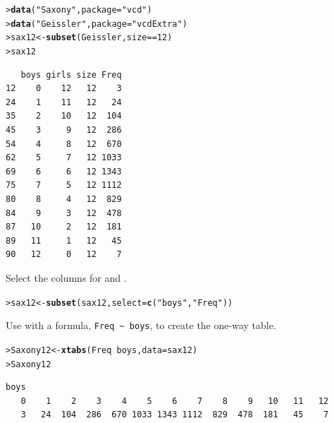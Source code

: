 \documentclass[11pt]{report}\usepackage[]{graphicx}\usepackage[]{color}
\makeatletter
\newcommand{\hlnum}[1]{\textcolor[rgb]{0.686,0.059,0.569}{#1}}%
\newcommand{\hlstr}[1]{\textcolor[rgb]{0.192,0.494,0.8}{#1}}%
\newcommand{\hlopt}[1]{\textcolor[rgb]{0,0,0}{#1}}%
\newcommand{\hlstd}[1]{\textcolor[rgb]{0.345,0.345,0.345}{#1}}%
\newcommand{\hlkwb}[1]{\textcolor[rgb]{0.69,0.353,0.396}{#1}}%
\newcommand{\hlkwc}[1]{\textcolor[rgb]{0.333,0.667,0.333}{#1}}%
\newcommand{\hlkwd}[1]{\textcolor[rgb]{0.737,0.353,0.396}{\textbf{#1}}}%
\newenvironment{kframe}{%
 \def\at@end@of@kframe{}%
 \ifinner\ifhmode%
  \def\at@end@of@kframe{\end{minipage}}%
  \begin{minipage}{\columnwidth}%
 \fi\fi%
 \def\FrameCommand##1{\hskip\@totalleftmargin \hskip-\fboxsep
 \colorbox{shadecolor}{##1}\hskip-\fboxsep
     \hskip-\linewidth \hskip-\@totalleftmargin \hskip\columnwidth}%
 \MakeFramed {\advance\hsize-\width
   \@totalleftmargin\z@ \linewidth\hsize
   \@setminipage}}%
 {\par\unskip\endMakeFramed%
 \at@end@of@kframe}
\newenvironment{knitrout}{}{} %
\renewenvironment{knitrout}{\small\renewcommand{\baselinestretch}{.85}}{} %
\makeatother
\begin{document}
\begin{Exercises}
\begin{enumerate*}
\begin{ans}
\begin{knitrout}
\begin{kframe}
\begin{alltt}
\hlstd{> }\hlkwd{data}\hlstd{(}\hlstr{"Saxony"}\hlstd{,} \hlkwc{package}\hlstd{=}\hlstr{"vcd"}\hlstd{)}
\hlstd{> }\hlkwd{data}\hlstd{(}\hlstr{"Geissler"}\hlstd{,} \hlkwc{package}\hlstd{=}\hlstr{"vcdExtra"}\hlstd{)}
\hlstd{> }\hlstd{sax12} \hlkwb{<-} \hlkwd{subset}\hlstd{(Geissler, size}\hlopt{==}\hlnum{12}\hlstd{)}
\hlstd{> }\hlstd{sax12}
\end{alltt}
\begin{verbatim}
   boys girls size Freq
12    0    12   12    3
24    1    11   12   24
35    2    10   12  104
45    3     9   12  286
54    4     8   12  670
62    5     7   12 1033
69    6     6   12 1343
75    7     5   12 1112
80    8     4   12  829
84    9     3   12  478
87   10     2   12  181
89   11     1   12   45
90   12     0   12    7
\end{verbatim}
\end{kframe}
\end{knitrout}
    \end{ans}
    
    \item Select the columns for  and .
    \begin{ans}
\begin{knitrout}
\color{fgcolor}\begin{kframe}
\begin{alltt}
\hlstd{> }\hlstd{sax12} \hlkwb{<-} \hlkwd{subset}\hlstd{(sax12,} \hlkwc{select}\hlstd{=}\hlkwd{c}\hlstd{(}\hlstr{"boys"}\hlstd{,}\hlstr{"Freq"}\hlstd{))}
\end{alltt}
\end{kframe}
\end{knitrout}
    \end{ans}
    
    \item Use  with a formula, \verb|Freq ~ boys|, to create the
    one-way table.
    \begin{ans}
\begin{knitrout}
\color{fgcolor}\begin{kframe}
\begin{alltt}
\hlstd{> }\hlstd{Saxony12}\hlkwb{<-}\hlkwd{xtabs}\hlstd{(Freq}\hlopt{~}\hlstd{boys,} \hlkwc{data}\hlstd{=sax12)}
\hlstd{> }\hlstd{Saxony12}
\end{alltt}
\begin{verbatim}
boys
   0    1    2    3    4    5    6    7    8    9   10   11   12 
   3   24  104  286  670 1033 1343 1112  829  478  181   45    7 
\end{verbatim}
\end{kframe}
\end{knitrout}
    \end{ans}
    

\end{enumerate*}
\end{Exercises}
\end{document}
